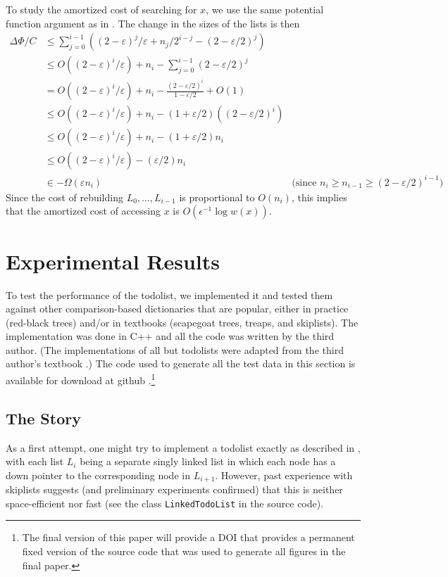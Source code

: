 \documentclass[lotsofwhite]{patmorin}
\newcommand{\eps}{\varepsilon}
\begin{document}
To study the amortized cost of searching for $x$, we use the same
potential function argument as in .  The change in the sizes of the lists is then 
\begin{align*}
  \Delta\Phi/C & \le \sum_{j=0}^{i-1}\left((2-\eps)^j/\eps + n_j/2^{i-j} - (2-\eps/2)^j\right) \\
  & \le O((2-\eps)^i/\eps) + n_i - \sum_{j=0}^{i-1}(2-\eps/2)^j \\
  & = O((2-\eps)^i/\eps) + n_i - \frac{(2-\eps/2)^i}{1-\eps/2} + O(1) \\
  & \le O((2-\eps)^i/\eps) + n_i - (1+\eps/2)((2-\eps/2)^i) \\
  & \le O((2-\eps)^i/\eps) + n_i - (1+\eps/2)n_i \\
  & \le O((2-\eps)^i/\eps) - (\eps/2)n_i \\
  & \in - \Omega(\eps n_i) & \text{(since $n_i \ge n_{i-1} \ge (2-\eps/2)^{i-1}$)}
\end{align*}
Since the cost of rebuilding $L_0,\ldots,L_{i-1}$ is proportional to $O(n_i)$, this implies that the amortized cost of accessing $x$ is $O(\epsilon^{-1}\log w(x))$.


\section{Experimental Results}

To test the performance of the todolist, we implemented
it and tested them against other comparison-based dictionaries that
are popular, either in practice (red-black trees) and/or in textbooks
(scapegoat trees, treaps, and skiplists).  The implementation
was done in C++ and all the code was written by the third author.
(The implementations of all but todolists were adapted from the third author's
textbook \cite{S}.)  The code used to generate all the test data in this
section is available for download at github \cite{}.\footnote{The final
version of this paper will provide a DOI that provides a permanent fixed
version of the source code that was used to generate all figures in the
final paper.}

\subsection{The Story}

As a first attempt, one might try to implement a todolist exactly
as described in , with each list $L_i$ being a
separate singly linked list in which each node has a down pointer to
the corresponding node in $L_{i+1}$.  However, past experience with
skiplists suggests (and preliminary experiments confirmed) that this is
neither space-efficient nor fast (see the class \texttt{LinkedTodoList}
in the source code).
\end{document}
